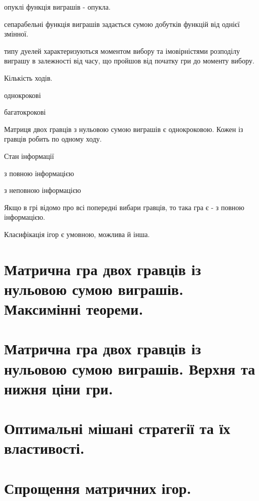 \documentclass[12pt,a4paper]{article}
\newenvironment{slim_enumerate}{
\begin{enumerate}
  \setlength{\itemsep}{1pt}
  \setlength{\parskip}{0pt}
  \setlength{\parsep}{0pt}}
{\end{enumerate}}
\newenvironment{slim_itemize}{
\begin{itemize}
  \setlength{\itemsep}{1pt}
  \setlength{\parskip}{0pt}
  \setlength{\parsep}{0pt}}
{\end{itemize}}
\newenvironment{slim_description}{
\begin{description}
  \setlength{\itemsep}{1pt}
  \setlength{\parskip}{0pt}
  \setlength{\parsep}{0pt}}
{\end{description}}
\begin{document}
\begin{slim_enumerate}
\begin{slim_description}
    \item[опуклі] функція виграшів - опукла.
    \item[сепарабельні] функція виграшів задається сумою добутків функцій від однієї змінної.
    \item[типу дуелей] характеризуються моментом вибору та імовірністями розподілу виграшу в залежності від часу, що пройшов від початку гри до моменту вибору.
  \end{slim_description}
  \item Кількість ходів.
  \begin{slim_itemize}
    \item однокрокові
    \item багатокрокові
  \end{slim_itemize}
  Матриця двох гравців з нульовою сумою виграшів є однокроковою. Кожен із гравців робить по одному ходу.
  \item Стан інформації
  \begin{slim_itemize}
    \item з повною інформацією
    \item з неповною інформацією
  \end{slim_itemize}
  Якщо в грі відомо про всі попередні вибари гравців, то така гра є - з повною інформацією.
\end{slim_enumerate}

Класифікація ігор є умовною, можлива й інша.

\clearpage

\section{Матрична гра двох гравців із нульовою сумою виграшів. Максимінні теореми.}

\clearpage

\section{Матрична гра двох гравців із нульовою сумою виграшів. Верхня та нижня ціни гри.}

\clearpage

\section{Оптимальні мішані стратегії та їх властивості.}

\clearpage

\section{Спрощення матричних ігор.}
\end{document}

